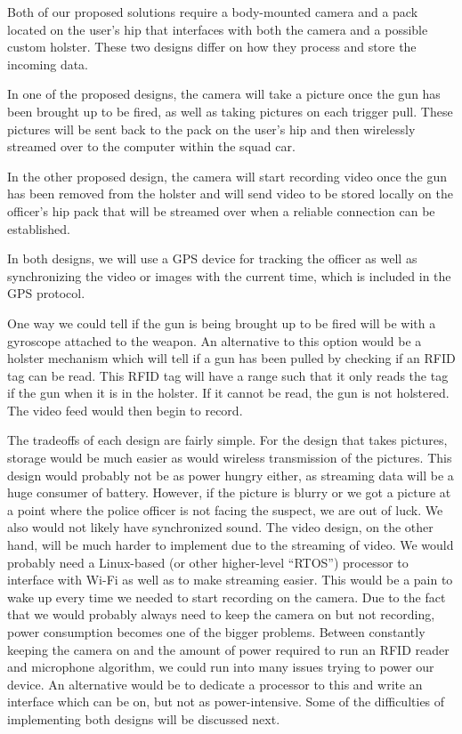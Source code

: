 \documentclass[12pt]{article}
\begin{document}
Both of our proposed solutions require a body-mounted camera and a pack located
on the user's hip that interfaces with both the camera and a possible custom
holster. These two designs differ on how they process and store the
incoming data.

In one of the proposed designs, the camera will take a picture once the gun has
been brought up to be fired, as well as taking pictures on each trigger pull.
These pictures will be sent back to the pack on the user's hip and then
wirelessly streamed over to the computer within the squad car. 

In the other proposed design, the camera will start recording video once the
gun has been removed from the holster and will send video to be stored locally
on the officer's hip pack that will be streamed over when a reliable connection
can be established.

In both designs, we will use a GPS device for tracking the officer as well as
synchronizing the video or images with the current time, which is included in
the GPS protocol.

One way we could tell if the gun is being brought up to be fired will be with a
gyroscope attached to the weapon. An alternative to this option would be a
holster mechanism which will tell if a gun has been pulled by checking if an
RFID tag can be read. This RFID tag will have a range such that it only reads
the tag if the gun when it is in the holster. If it cannot be read, the gun is
not holstered. The video feed would then begin to record.

The tradeoffs of each design are fairly simple. For the design that takes
pictures, storage would be much easier as would wireless transmission of the
pictures. This design would probably not be as power hungry either, as
streaming data will be a huge consumer of battery. However, if the picture is
blurry or we got a picture at a point where the police officer is not facing
the suspect, we are out of luck. We also would not likely have synchronized
sound. The video design, on the other hand, will be much harder to implement
due to the streaming of video. We would probably need a Linux-based (or other
higher-level ``RTOS'') processor to interface with Wi-Fi as well as to make
streaming easier.  This would be a pain to wake up every time we needed to
start recording on the camera. Due to the fact that we would probably always
need to keep the camera on but not recording, power consumption becomes one of
the bigger problems.  Between constantly keeping the camera on and the amount
of power required to run an RFID reader and microphone algorithm, we could run
into many issues trying to power our device. An alternative would be to
dedicate a processor to this and write an interface which can be on, but not as
power-intensive.  Some of the difficulties of implementing both designs will be
discussed next.
\end{document}
